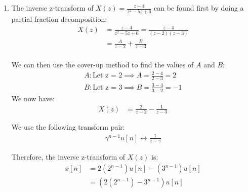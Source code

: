 \documentclass{article}
\begin{document}
\begin{enumerate}[label=P1.\arabic*]
\begin{enumerate}
        \item The inverse z-transform of $X(z) = \frac{z-4}{z^2-5z+6}$ can be found first by doing a partial fraction decomposition:
        \begin{align*}
            X(z) &= \frac{z-4}{z^2-5z+6} = \frac{z-4}{(z-2)(z-3)} \\
            &= \frac{A}{z-2} + \frac{B}{z-3} \\
        \end{align*}

        We can then use the cover-up method to find the values of $A$ and $B$:
        \begin{align*}
            A: \text{Let z = 2} \implies A = \frac{2-4}{2-3} = 2 \\
            B: \text{Let z = 3} \implies B = \frac{3-4}{3-2} = -1
        \end{align*}
        We now have:
        \begin{align*}
            X(z) &= \frac{2}{z-2} - \frac{1}{z-3}
        \end{align*}

        We use the following transform pair:
        \begin{align*}
            \gamma^{n-1} u[n] \longleftrightarrow \frac{1}{z-\gamma}
        \end{align*}

        Therefore, the inverse z-transform of $X(z)$ is:
        \begin{align*}
            x[n] &= 2(2^{n-1})u[n] - (3^{n-1})u[n] \\
            &= (2(2^{n-1}) - 3^{n-1})u[n]
        \end{align*}
    \end{enumerate}
\end{enumerate}


\end{document}
